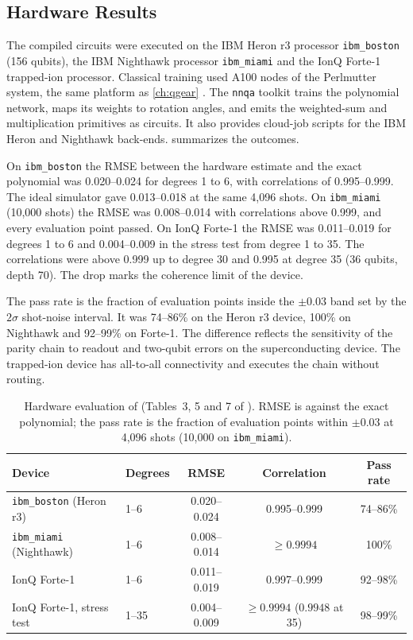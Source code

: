 \subsection{Hardware Results}\label{sec:qml:nnqa:hw}

The compiled circuits were executed on the IBM Heron r3 processor \texttt{ibm\_boston} (156 qubits), the IBM Nighthawk processor \texttt{ibm\_miami} and the IonQ Forte-1 trapped-ion processor. Classical training used A100 nodes of the Perlmutter system, the same platform as \cref{ch:qgear} \cite{guo2026nnqa}. The \texttt{nnqa} toolkit trains the polynomial network, maps its weights to rotation angles, and emits the weighted-sum and multiplication primitives as \qiskit{} circuits. It also provides cloud-job scripts for the IBM Heron and Nighthawk back-ends.  summarizes the outcomes.

On \texttt{ibm\_boston} the RMSE between the hardware estimate and the exact polynomial was 0.020--0.024 for degrees 1 to 6, with correlations of 0.995--0.999. The ideal simulator gave 0.013--0.018 at the same 4,096 shots. On \texttt{ibm\_miami} (10,000 shots) the RMSE was 0.008--0.014 with correlations above 0.999, and every evaluation point passed. On IonQ Forte-1 the RMSE was 0.011--0.019 for degrees 1 to 6 and 0.004--0.009 in the stress test from degree 1 to 35. The correlations were above 0.999 up to degree 30 and 0.995 at degree 35 (36 qubits, depth 70). The drop marks the coherence limit of the device.

The pass rate is the fraction of evaluation points inside the $\pm0.03$ band set by the $2\sigma$ shot-noise interval. It was 74--86\% on the Heron r3 device, 100\% on Nighthawk and 92--99\% on Forte-1. The difference reflects the sensitivity of the parity chain to readout and two-qubit errors on the superconducting device. The trapped-ion device has all-to-all connectivity and executes the chain without routing.

\begin{table}[htbp]
\caption{Hardware evaluation of \nnqa{} (Tables~3, 5 and 7 of \cite{guo2026nnqa}). RMSE is against the exact polynomial; the pass rate is the fraction of evaluation points within $\pm0.03$ at 4,096 shots (10,000 on \texttt{ibm\_miami}).}\label{tab:qml:nnqa-hw}
\centering
\small
\begin{tabular}{@{}llccc@{}}
\toprule
Device & Degrees & RMSE & Correlation & Pass rate \\
\midrule
\texttt{ibm\_boston} (Heron r3) & 1--6 & 0.020--0.024 & 0.995--0.999 & 74--86\% \\
\texttt{ibm\_miami} (Nighthawk) & 1--6 & 0.008--0.014 & $\ge 0.9994$ & 100\% \\
IonQ Forte-1 & 1--6 & 0.011--0.019 & 0.997--0.999 & 92--98\% \\
IonQ Forte-1, stress test & 1--35 & 0.004--0.009 & $\ge 0.9994$ ($0.9948$ at 35) & 98--99\% \\
\bottomrule
\end{tabular}
\end{table}


